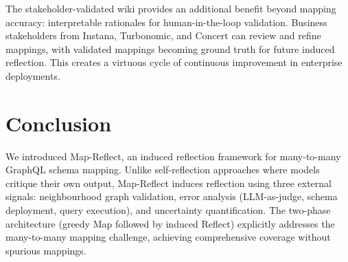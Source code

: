 \documentclass[sigconf, nonacm]{acmart}
\newcommand{\deleted}[1]{\textcolor{red}{#1}}
\begin{document}

The stakeholder-validated wiki provides an additional benefit beyond mapping accuracy: interpretable rationales for human-in-the-loop validation. Business stakeholders from Instana, Turbonomic, and Concert can review and refine mappings, with validated mappings becoming ground truth for future induced reflection. This creates a virtuous cycle of continuous improvement in enterprise deployments.


\section{Conclusion}


We introduced Map-Reflect, an induced reflection framework for many-to-many GraphQL schema mapping. Unlike self-reflection approaches where models critique their own output, Map-Reflect induces reflection using three external signals: neighbourhood graph validation, error analysis (LLM-as-judge, schema deployment, query execution), and uncertainty quantification. The two-phase architecture (greedy Map followed by induced Reflect) explicitly addresses the many-to-many mapping challenge, achieving comprehensive coverage without spurious mappings.
\end{document}
